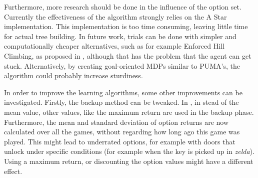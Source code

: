 % 

Furthermore, more research should be done in the influence of the option set.
Currently the effectiveness of the algorithm strongly relies on the A Star
implementation. This implementation is too time consuming, leaving
little time for actual tree building. In future work, trials can be done with
simpler and computationally cheaper alternatives, such as for example Enforced
Hill Climbing, as proposed in \cite{ross2014general}, although that has the
problem that the agent can get stuck. Alternatively, by creating goal-oriented
MDPs similar to PUMA's, the algorithm could probably increase sturdiness.

% 

In order to improve the learning algorithms, some other improvements can be
investigated. Firstly, the backup method can be tweaked. In
\cite{coulom2007efficient}, in stead of the mean value, other values, like the
maximum return are used in the backup phase. Furthermore, the mean and standard
deviation of option returns are now calculated over all the games, without
regarding how long ago this game was played. This might lead to underrated
options, for example with doors that unlock under specific conditions (for
example when the key is picked up in \textit{zelda}).  Using a maximum return,
or discounting the option values might have a different effect.

